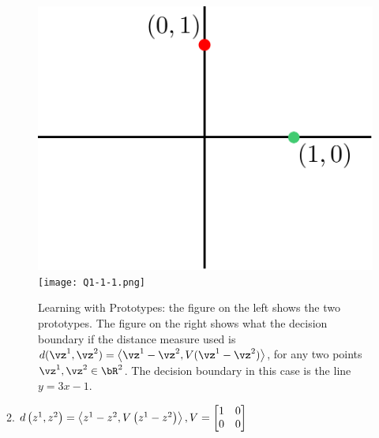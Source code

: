 \documentclass[a4paper,11pt]{article}
\begin{document}
\begin{mlsolution}
\begin{figure}[th]%
\centering
\includegraphics[width=0.3\columnwidth]{proto_blank.png}%
\hfill
\texttt{[image: Q1-1-1.png]}%
\caption{Learning with Prototypes: the figure on the left shows the two prototypes. The figure on the right shows what the decision boundary if the distance measure used is $d(\vz^1,\vz^2) = \left \langle \vz^1-\vz^2, V (\vz^1-\vz^2) \right \rangle$, for any two points $\vz^1,\vz^2 \in \bR^2$. The decision boundary in this case is the line $y = 3x-1$.}%
\label{fig:proto1}%
\end{figure}

2.  \begin{math}
 d\left ( z^{1}, \space z^{2} \right ) = \left \langle z^{1} - z^{2}, \space V \left ( z^{1} - z^{2} \right ) \right \rangle, V = \begin{bmatrix} 
1 & 0 \\ 0 & 0 \end{bmatrix} \\ \end{math}


\end{mlsolution}
\end{document}
